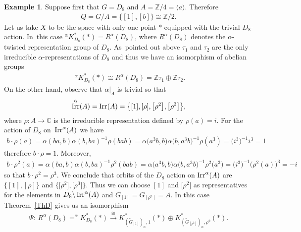 \documentclass[pdftex]{sigma}
\def\Z{\mathbb{Z}}
\def\C{\mathbb{C}}
\DeclareMathOperator{\Irr}{\textup{Irr}}
\theoremstyle{definition}
\newtheorem{Ex}[Th]{Example}
\numberwithin{equation}{section}
\begin{document}
\begin{Ex}\label{Example1} Suppose first that $G=D_{8}$ and $A=\Z/4=\langle a\rangle$. Therefore
\begin{gather*}
Q=G/A=\{[1],[b]\}\cong \Z/2.
\end{gather*}
Let us take $X$ to be the space with only one point $\ast$ equipped with the trivial
$D_{8}$-action. In~this case $^{\alpha}K^{\ast}_{D_{8}}(\ast)= R^{\alpha}(D_{8})$, where
$R^{\alpha}(D_{8})$ denotes the $\alpha$-twisted representation group of $D_{8}$.
As~pointed out above $\tau_{1}$ and $\tau_{2}$ are the only irreducible
$\alpha$-representations of $D_{8}$ and thus we have an isomorphism of abelian groups
\begin{gather*}
\phantom{i}^{\alpha}K^{\ast}_{D_{8}}(\ast)\cong R^{\alpha}(D_{8})
=\Z\tau_{1}\oplus\Z\tau_{2}.
\end{gather*}
On the other hand, observe that
$\alpha|_{A}$ is trivial so that
\begin{gather*}
\Irr^{\alpha}(A)=\Irr(A)=\big\{[1],[\rho],\big[\rho^{2}\big], \big[\rho^{3}\big]\big\},
\end{gather*}
where $\rho\colon A\rightarrow \C$ is the irreducible representation defined by $\rho(a)=i$.
For the action of $D_{8}$ on~$\Irr^{\alpha}(A)$ we have
\begin{gather*}
b\cdot\rho(a)=\alpha(ba,b)\alpha(b,ba)^{-1}\rho(bab)
=\alpha\big(a^{3}b,b\big)\alpha\big(b,a^{3}b\big)^{-1}\rho(a^{3})
=\big(i^{3}\big)^{-1}i^{3}=1
\end{gather*}
therefore $b\cdot \rho=1$. Moreover,
\begin{gather*}
b\cdot\rho^{2}(a)=\alpha(ba,b)\alpha(b,ba)^{-1}\rho^{2}(bab)
=\alpha\big(a^{3}b,b\big)\alpha\big(b,a^{3}b\big)^{-1}\rho^{2}\big(a^{3}\big)
=\big(i^{3}\big)^{-1}\big(\rho^{2}(a)\big)^{3}=-i
\end{gather*}
so that $b\cdot\rho^{2}=\rho^{3}$. We conclude that orbits of the $D_{8}$ action on
$\Irr^{\alpha}(A)$ are $\{[1],[\rho]\}$ and $\big\{\big[\rho^{2}\big],\big[\rho^{3}\big]\big\}$. Thus we can choose
$[1]$ and $\big[\rho^{2}\big]$ as representatives for the elements in $D_{8}\backslash \Irr^{\alpha}(A)$
and $G_{[1]}=G_{[\rho^{2}]}=A$.
In this case Theorem~\ref{ThD} gives us an isomorphism
\begin{gather*}
\Psi\colon\ R^{\alpha}(D_{8})=^{\alpha}K^{\ast}_{D_{8}}(\ast)\stackrel{\cong}{\rightarrow}
K^{\ast}_{(\widetilde{G}_{[1]})_{\alpha},1}(\ast)\oplus
K^{\ast}_{(\widetilde{G}_{[\rho^{2}]})_{\alpha},\rho^{2}}(\ast).
\end{gather*}

\end{Ex}
\end{document}

